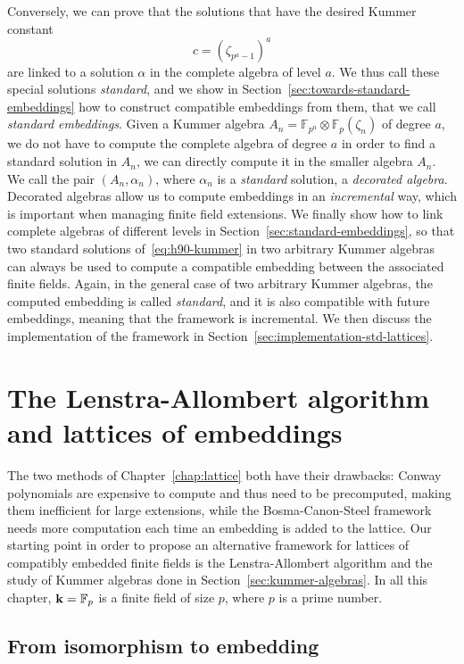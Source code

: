 Conversely, we can prove that the solutions that have the desired Kummer
constant 
\[
  c = (\zeta_{p^a-1})^a
\]
are linked to a solution $\alpha$ in the complete algebra of level $a$.
We thus call these special solutions \emph{standard}, and we show in
Section~\ref{sec:towards-standard-embeddings} how to construct compatible
embeddings from them, that we call \emph{standard embeddings}. Given a Kummer
algebra $A_n = \mathbb{F}_{p^{n}}\otimes \mathbb{F}_{p}(\zeta_n)$ of degree $a$,
we do not have to compute the complete algebra of degree $a$ in order to find a
standard solution in $A_n$, we can directly compute it in the smaller algebra
$A_n$. We call the pair $(A_n, \alpha_n)$, where $\alpha_n$ is a \emph{standard}
solution, a \emph{decorated algebra}. Decorated algebras allow us to compute
embeddings in an \emph{incremental} way, which is important when managing
finite field extensions. We finally show how to link complete algebras of
different levels in Section~\ref{sec:standard-embeddings}, so that two standard
solutions of~\eqref{eq:h90-kummer} in two arbitrary Kummer algebras can always
be used to compute a compatible embedding between the associated finite fields.
Again, in the general case of two arbitrary Kummer algebras, the computed
embedding is called \emph{standard}, and it is also compatible with future
embeddings, meaning that the framework is incremental. We then discuss the
implementation of the framework in
Section~\ref{sec:implementation-std-lattices}.

\section{The Lenstra-Allombert algorithm and lattices of embeddings}
\label{sec:lenstra-allombert-embeddings}

The two methods of Chapter~\ref{chap:lattice} both have their drawbacks: Conway
polynomials are expensive to compute and thus need to be precomputed, making
them inefficient for large extensions, while the Bosma-Canon-Steel framework
needs more computation each time an embedding is added to the lattice.
Our starting point in order to propose an alternative framework for lattices of
compatibly embedded finite fields is the Lenstra-Allombert algorithm and the
study of Kummer algebras done in Section~\ref{sec:kummer-algebras}. In all this
chapter, $\mathbf{k}=\mathbb{F}_p$ is a finite field of size $p$, where
$p$ is a prime number.

\subsection{From isomorphism to embedding}
\label{sec:iso-to-emb}

